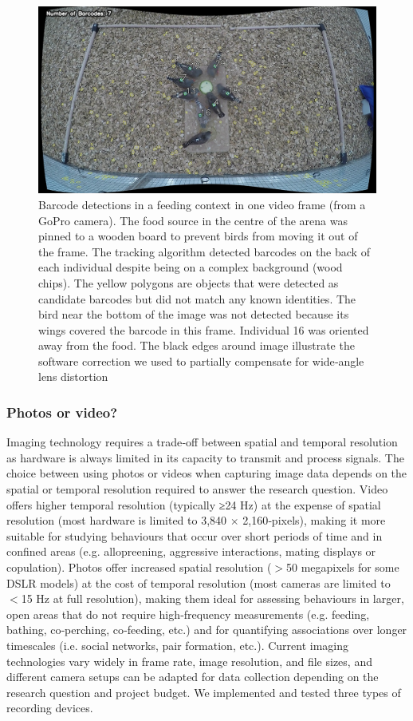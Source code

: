 \documentclass[11pt,a4paper,twoside]{book}
\begin{document}
\begin{doublespace}
\begin{figure}[!htb]
    \centering
    \includegraphics{Graving_IMPRS_Thesis/figures/bird_figure_3.jpg}
    \caption{Barcode detections in a feeding context in one video frame (from a GoPro camera). The food source in the centre of the arena was pinned to a wooden board to prevent birds from moving it out of the frame. The tracking algorithm detected barcodes on the back of each individual despite being on a complex background (wood chips). The yellow polygons are objects that were detected as candidate barcodes but did not match any known identities. The bird near the bottom of the image was not detected because its wings covered the barcode in this frame. Individual 16 was oriented away from the food. The black edges around image illustrate the software correction we used to partially compensate for wide‐angle lens distortion
}
    \label{fig:bird_figure_3}
\end{figure}

\subsubsection{Photos or video?}
Imaging technology requires a trade‐off between spatial and temporal resolution as hardware is always limited in its capacity to transmit and process signals. The choice between using photos or videos when capturing image data depends on the spatial or temporal resolution required to answer the research question. Video offers higher temporal resolution (typically ≥24 Hz) at the expense of spatial resolution (most hardware is limited to 3,840 $\times$ 2,160‐pixels), making it more suitable for studying behaviours that occur over short periods of time and in confined areas (e.g. allopreening, aggressive interactions, mating displays or copulation). Photos offer increased spatial resolution ($>$50 megapixels for some DSLR models) at the cost of temporal resolution (most cameras are limited to $<$15 Hz at full resolution), making them ideal for assessing behaviours in larger, open areas that do not require high‐frequency measurements (e.g. feeding, bathing, co‐perching, co‐feeding, etc.) and for quantifying associations over longer timescales (i.e. social networks, pair formation, etc.). Current imaging technologies vary widely in frame rate, image resolution, and file sizes, and different camera setups can be adapted for data collection depending on the research question and project budget. We implemented and tested three types of recording devices.


\end{doublespace}
\end{document}
